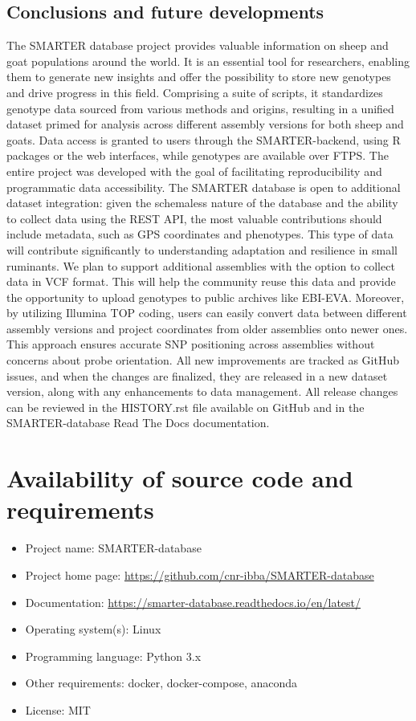 \documentclass[a4paper,num-refs,gigabyte]{oup-contemporary}
\begin{document}
\subsection{Conclusions and future developments}
The SMARTER database project provides valuable information on sheep and goat populations around the world. It is an essential tool for researchers, enabling them to generate new insights and offer the possibility to store new genotypes and drive progress in this field. Comprising a suite of scripts, it standardizes genotype data sourced from various methods and origins, resulting in a unified dataset primed for analysis across different assembly versions for both sheep and goats. Data access is granted to users through the SMARTER-backend, using R packages or the web interfaces, while genotypes are available over FTPS. The entire project was developed with the goal of facilitating reproducibility and programmatic data accessibility.
The SMARTER database is open to additional dataset integration: given the schemaless nature of the database and the ability to collect data using the REST API, the most valuable contributions should include metadata, such as GPS coordinates and phenotypes. This type of data will contribute significantly to understanding adaptation and resilience in small ruminants.
We plan to support additional assemblies with the option to collect data in VCF format. This will help the community reuse this data and provide the opportunity to upload genotypes to public archives like EBI-EVA.
Moreover, by utilizing Illumina TOP coding, users can easily convert data between different assembly versions and project coordinates from older assemblies onto newer ones. This approach ensures accurate SNP positioning across assemblies without concerns about probe orientation.
All new improvements are tracked as GitHub issues\citep{SMARTERDB-GH-ISSUES}, and when the changes are finalized, they are released in a new dataset version, along with any enhancements to data management. All release changes can be reviewed in the HISTORY.rst\citep{SMARTERDB-GH-HISTORY} file available on GitHub and in the SMARTER-database Read The Docs documentation\citep{SMARTERdocs}.

\section{Availability of source code and requirements}

\begin{itemize}
\item Project name: SMARTER-database
\item Project home page: \url{https://github.com/cnr-ibba/SMARTER-database}
\item Documentation: \url{https://smarter-database.readthedocs.io/en/latest/}
\item Operating system(s): Linux
\item Programming language: Python 3.x
\item Other requirements: docker, docker-compose, anaconda
\item License: MIT
\end{itemize}
\end{document}
